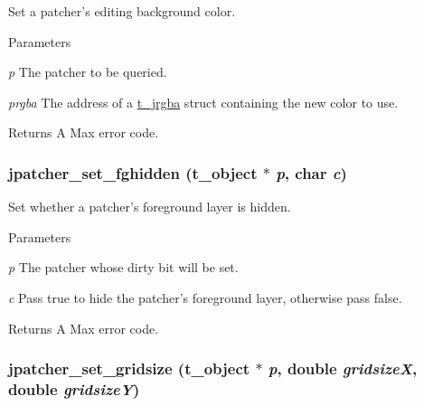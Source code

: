 Set a patcher's editing background color. 
\begin{DoxyParams}{Parameters}
\item[{\em p}]The patcher to be queried. \item[{\em prgba}]The address of a \hyperlink{structt__jrgba}{t\_\-jrgba} struct containing the new color to use. \end{DoxyParams}
\begin{DoxyReturn}{Returns}
A Max error code. 
\end{DoxyReturn}
\hypertarget{group__jpatcher_ga905d41f7b001aa779374307b67a07495}{
\subsubsection[{jpatcher\_\-set\_\-fghidden}]{ jpatcher\_\-set\_\-fghidden ({\bf t\_\-object} $\ast$ {\em p}, \/  char {\em c})}}
\label{group__jpatcher_ga905d41f7b001aa779374307b67a07495}


Set whether a patcher's foreground layer is hidden. 
\begin{DoxyParams}{Parameters}
\item[{\em p}]The patcher whose dirty bit will be set. \item[{\em c}]Pass true to hide the patcher's foreground layer, otherwise pass false. \end{DoxyParams}
\begin{DoxyReturn}{Returns}
A Max error code. 
\end{DoxyReturn}
\hypertarget{group__jpatcher_ga34113c97506a3a5c25d3a00805f43b38}{
\subsubsection[{jpatcher\_\-set\_\-gridsize}]{ jpatcher\_\-set\_\-gridsize ({\bf t\_\-object} $\ast$ {\em p}, \/  double {\em gridsizeX}, \/  double {\em gridsizeY})}}
\label{group__jpatcher_ga34113c97506a3a5c25d3a00805f43b38}



